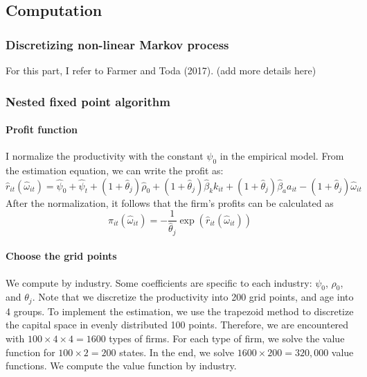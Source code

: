 \documentclass[11pt]{article}
\begin{document}
\subsection{Computation} \label{app_comp}
\subsubsection{Discretizing non-linear Markov process}

For this part, I refer to Farmer and Toda (2017). 
(add more details here)

\subsubsection{Nested fixed point algorithm}

\paragraph{Profit function}

I normalize the productivity with the constant $\psi_{0}$ in the
empirical model. From the estimation equation, we can write the profit
as:
\begin{equation}
\hat{r}_{it}\left(\hat{\omega}_{it}\right)=\hat{\psi}_{0}+\hat{\psi}_{t}+\left(1+\hat{\theta}_{j}\right)\hat{\rho}_{0}+\left(1+\hat{\theta}_{j}\right)\hat{\beta}_{k}k_{it}+\left(1+\hat{\theta}_{j}\right)\hat{\beta}_{a}a_{it}-\left(1+\hat{\theta}_{j}\right)\hat{\omega}_{it}
\end{equation}
After the normalization, it follows that the firm's profits can be calculated as 
\begin{equation}
\pi_{it}\left(\hat{\omega}_{it}\right)=-\frac{1}{\hat{\theta}_{j}}\exp\left(\hat{r}_{it}\left(\hat{\omega}_{it}\right)\right)
\end{equation}

\paragraph{Choose the grid points}

We compute by industry. Some coefficients are specific
to each industry: $\psi_{0}$, $\rho_{0}$, and $\theta_{j}$. Note
that we discretize the productivity into 200 grid points, and age
into 4 groups. To implement the estimation, we use the trapezoid method
to discretize the capital space in evenly distributed 100 points.
Therefore, we are encountered with $100\times4\times4=1600$ types
of firms. For each type of firm, we solve the value function for $100\times2=200$
states. In the end, we solve $1600\times200=320,000$ value functions.
We compute the value function by industry. 
\end{document}
